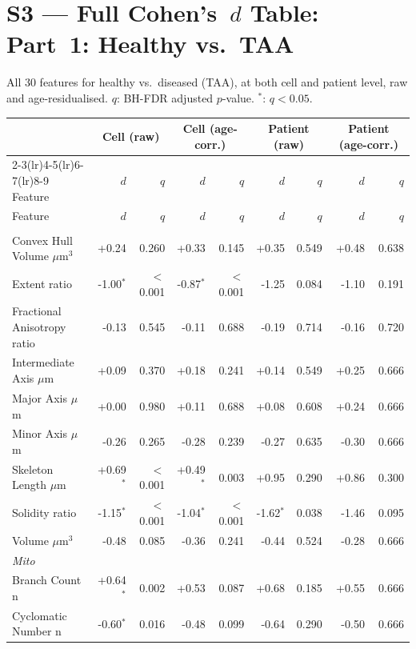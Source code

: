 \documentclass[11pt,a4paper]{article}
\begin{document}
\section*{S3 — Full Cohen's~$d$ Table: Part~1: Healthy vs.\ TAA}
All 30 features for healthy vs.\ diseased (TAA), at both cell and patient level,
raw and age-residualised. $q$: BH-FDR adjusted $p$-value. $^{*}$: $q < 0.05$.
\vspace{1em}
\begin{longtable}{lrrrrrrrr}
\toprule
 & \multicolumn{2}{c}{Cell (raw)} & \multicolumn{2}{c}{Cell (age-corr.)} & \multicolumn{2}{c}{Patient (raw)} & \multicolumn{2}{c}{Patient (age-corr.)} \\
\cmidrule(lr){2-3}\cmidrule(lr){4-5}\cmidrule(lr){6-7}\cmidrule(lr){8-9}
Feature & $d$ & $q$ & $d$ & $q$ & $d$ & $q$ & $d$ & $q$ \\
\midrule\endfirsthead
\toprule Feature & $d$ & $q$ & $d$ & $q$ & $d$ & $q$ & $d$ & $q$ \\\midrule\endhead
\bottomrule\endfoot
\multicolumn{9}{l}{\textit{Actin}} \\
  Convex Hull Volume $\mu$m$^{3}$ & +0.24 & 0.260 & +0.33 & 0.145 & +0.35 & 0.549 & +0.48 & 0.638 \\
  Extent ratio & -1.00$^{*}$ & $<$0.001 & -0.87$^{*}$ & $<$0.001 & -1.25 & 0.084 & -1.10 & 0.191 \\
  Fractional Anisotropy ratio & -0.13 & 0.545 & -0.11 & 0.688 & -0.19 & 0.714 & -0.16 & 0.720 \\
  Intermediate Axis $\mu$m & +0.09 & 0.370 & +0.18 & 0.241 & +0.14 & 0.549 & +0.25 & 0.666 \\
  Major Axis $\mu$m & +0.00 & 0.980 & +0.11 & 0.688 & +0.08 & 0.608 & +0.24 & 0.666 \\
  Minor Axis $\mu$m & -0.26 & 0.265 & -0.28 & 0.239 & -0.27 & 0.635 & -0.30 & 0.666 \\
  Skeleton Length $\mu$m & +0.69$^{*}$ & $<$0.001 & +0.49$^{*}$ & 0.003 & +0.95 & 0.290 & +0.86 & 0.300 \\
  Solidity ratio & -1.15$^{*}$ & $<$0.001 & -1.04$^{*}$ & $<$0.001 & -1.62$^{*}$ & 0.038 & -1.46 & 0.095 \\
  Volume $\mu$m$^{3}$ & -0.48 & 0.085 & -0.36 & 0.241 & -0.44 & 0.524 & -0.28 & 0.666 \\
\midrule
\multicolumn{9}{l}{\textit{Mito}} \\
  Branch Count n & +0.64$^{*}$ & 0.002 & +0.53 & 0.087 & +0.68 & 0.185 & +0.55 & 0.666 \\
  Cyclomatic Number n & -0.60$^{*}$ & 0.016 & -0.48 & 0.099 & -0.64 & 0.290 & -0.50 & 0.666 \\

\end{longtable}
\end{document}
